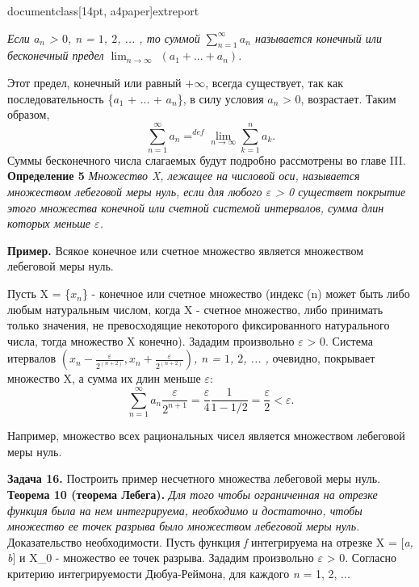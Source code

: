 documentclass[14pt, a4paper]{extreport}
\usepackage[a4paper, total={6in, 10in}]{geometry}
\usepackage[utf8]{inputenc}
\usepackage{mathtools}
\usepackage[russian]{babel}
\thispagestyle{empty}

\textit{Если $a_n$ > $0$, n = $1$, $2$, ... , то суммой $\sum_{n = 1}^{\infty}a_n$ называется конечный или бесконечный предел $\displaystyle\lim_{n \to \infty}$ $(a_1 + ... + a_n)$.}

Этот предел, конечный или равный $+\infty$, всегда существует, так как последовательность \{\textit{$a_1$} + ... + \textit{$a_n$}\}, в силу условия \textit{$a_n$} > 0, возрастает. Таким образом, $$\sum_{n = 1}^{\infty}a_n =^{def} \lim_{n \to \infty} \sum_{k = 1}^{n}a_k.$$ Суммы бесконечного числа слагаемых будут подробно рассмотрены во главе III.\\
\textbf{Определение 5} \textit{Множество X, лежащее на числовой оси, называется множеством лебеговой меры нуль, если для любого $\varepsilon$ > 0 существет покрытие этого множества конечной или счетной системой интервалов, сумма длин которых меньше $\varepsilon$. }

\textbf{Пример.} Всякое конечное или счетное множество является множеством лебеговой меры нуль.


Пусть X = \{\textit{$x_n$}\} - конечное или счетное множество (индекс \textint(n) может быть либо любым натуральным числом, когда X - счетное множество, либо принимать только значения, не превосходящие некоторого фиксированного натурального числа, тогда множество X конечно). Зададим произвольно $\varepsilon$ > 0. Система итервалов \textit{$(x_n - \frac{\varepsilon}{2^{(n+2)}}, x_n + \frac{\varepsilon}{2^{(n+2)}})$, n = $1$, $2$, ... ,} очевидно, покрывает множество X, а сумма их длин меньше  $\varepsilon$:$$\displaystyle\sum_{n = 1}^{\infty}a_n\frac{\varepsilon}{2^{n + 1}} = \frac{\varepsilon}{4}\frac{1}{1 - 1 / 2} = \frac{\varepsilon}{2} < \varepsilon.$$

Например, множество всех рациональных чисел является множеством лебеговой меры нуль.

\textbf{Задача 16.}\small{ Построить пример несчетного множества лебеговой меры нуль.}\\
\normalsize\textbf{Теорема 10 (теорема Лебега).} \normalsize\textit{Для того чтобы ограниченная на отрезке функция была на нем интегрируема, необходимо и достаточно, чтобы множество ее точек разрыва было множеством лебеговой меры нуль.}\\
\large{Доказательство необходимости. } \normalsize{Пусть функция \textit{f} интегрируема на отрезке X = [\textit{a, b}] и X_0 - множество ее точек разрыва. Зададим произвольно $\varepsilon$ > 0. Согласно критерию интегрируемости Дюбуа-Реймона, для каждого \textit{n} = 1, 2, ...}




